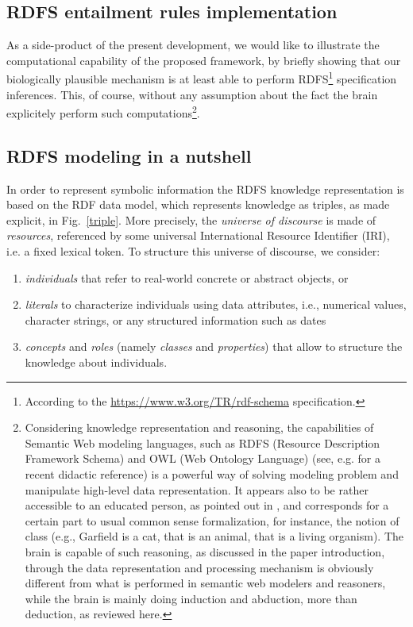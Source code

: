 \documentclass[sn-mathphys]{sn-jnl}
\begin{document}
\begin{appendices}
\section{RDFS entailment rules implementation} \label{RDFS-entailment-rules}

As a side-product of the present development, we would like to illustrate the computational capability of the proposed framework, by briefly showing that our biologically plausible mechanism is at least able to perform RDFS\footnote{According to the \url{https://www.w3.org/TR/rdf-schema} specification.} specification inferences. This, of course, without any assumption about the fact the brain explicitely perform such computations\footnote{Considering knowledge representation and reasoning, the capabilities of Semantic Web modeling languages, such as RDFS (Resource Description Framework Schema) and OWL (Web Ontology Language) (see, e.g. \cite{allemang_semantic_2020} for a recent didactic reference) is a powerful way of solving modeling problem and manipulate high-level data representation. It appears also to be rather accessible to an educated person, as pointed out in \cite{allemang_semantic_2020}, and corresponds for a certain part to usual common sense formalization, for instance, the notion of class (e.g., Garfield is a cat, that is an animal, that is a living organism). The brain is capable of such reasoning, as discussed in the paper introduction, through the data representation and processing mechanism is obviously different from what is performed in semantic web modelers and reasoners, while the brain is mainly doing induction and abduction, more than deduction, as reviewed here.}.

\subsection*{RDFS modeling in a nutshell}

In order to represent symbolic information the RDFS knowledge representation is based on the RDF data model, which represents knowledge  as triples, as made explicit, in Fig.~\ref{triple}. More precisely, the \emph{universe of discourse} is made of \emph{resources}, referenced by some universal International Resource Identifier (IRI), i.e. a fixed lexical token. To structure this universe of discourse, we consider: \begin{enumerate}[label=(\roman*)]
    \item \emph{individuals} that refer to real-world concrete or abstract objects, or 
    \item \emph{literals} to characterize individuals using data attributes, i.e., numerical values, character strings, or any structured information such as dates
    \item \emph{concepts} and \emph{roles} (namely \emph{classes} and \emph{properties}) that allow to structure the knowledge about individuals.
\end{enumerate}


\end{appendices}
\end{document}
